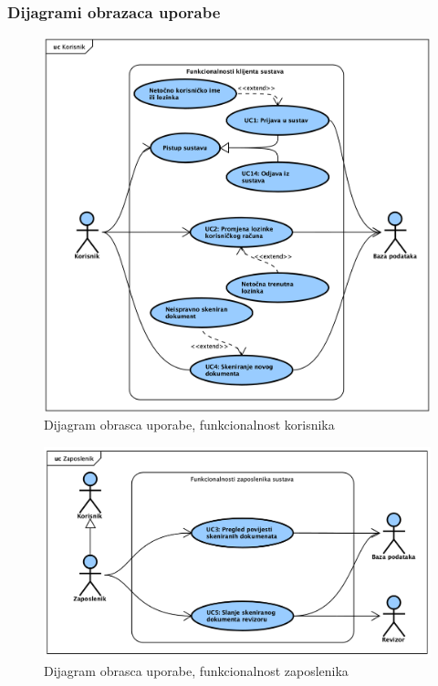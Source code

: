 				\eject{}
					
				\subsubsection{Dijagrami obrazaca uporabe}

					\begin{figure}[H]
						\includegraphics[width=\textwidth]{slike/UseCase_Korisnik.png} %
						\caption{Dijagram obrasca uporabe, funkcionalnost korisnika}
						\label{fig:usecase_korisnik} %
					\end{figure}

					\begin{figure}[H]
						\includegraphics[width=\textwidth]{slike/UseCase_Zaposlenik.png}
						\caption{Dijagram obrasca uporabe, funkcionalnost zaposlenika}
						\label{fig:usecase_zaposlenik}
					\end{figure}

